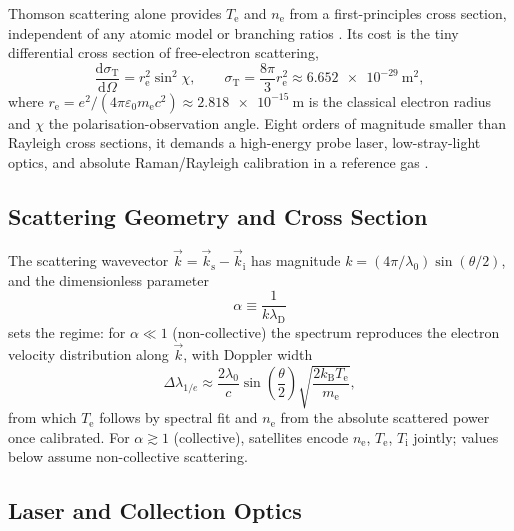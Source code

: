 Thomson scattering alone provides $T_{\mathrm{e}}$ and $n_{\mathrm{e}}$ from a first-principles cross section, independent of any atomic model or branching ratios \cite{ref0354,ref0384}. Its cost is the tiny differential cross section of free-electron scattering,
\begin{equation}
\frac{\mathrm{d}\sigma_{\mathrm{T}}}{\mathrm{d}\Omega} = r_{\mathrm{e}}^{2} \sin^{2}\chi , \qquad \sigma_{\mathrm{T}} = \frac{8\pi}{3} r_{\mathrm{e}}^{2} \approx \SI{6.652e-29}{\meter\squared} ,
\label{eq:specs-thomson-xsec}
\end{equation}
where $r_{\mathrm{e}} = e^{2}/(4\pi\varepsilon_{0} m_{\mathrm{e}} c^{2}) \approx \SI{2.818e-15}{\meter}$ is the classical electron radius and $\chi$ the polarisation-observation angle. Eight orders of magnitude smaller than Rayleigh cross sections, it demands a high-energy probe laser, low-stray-light optics, and absolute Raman/Rayleigh calibration in a reference gas \cite{ref0357,ref0362}.

\subsection{Scattering Geometry and Cross Section}

The scattering wavevector $\vec{k} = \vec{k}_{\mathrm{s}} - \vec{k}_{\mathrm{i}}$ has magnitude $k = (4\pi/\lambda_{0}) \sin(\theta/2)$, and the dimensionless parameter
\begin{equation}
\alpha \equiv \frac{1}{k \lambda_{\mathrm{D}}}
\label{eq:specs-alpha}
\end{equation}
sets the regime: for $\alpha \ll 1$ (non-collective) the spectrum reproduces the electron velocity distribution along $\vec{k}$, with Doppler width
\begin{equation}
\Delta\lambda_{1/e} \approx \frac{2\lambda_{0}}{c} \sin\!\left(\frac{\theta}{2}\right) \sqrt{\frac{2 k_{\mathrm{B}} T_{\mathrm{e}}}{m_{\mathrm{e}}}} ,
\label{eq:specs-thomson-doppler}
\end{equation}
from which $T_{\mathrm{e}}$ follows by spectral fit and $n_{\mathrm{e}}$ from the absolute scattered power once calibrated. For $\alpha \gtrsim 1$ (collective), satellites encode $n_{\mathrm{e}}$, $T_{\mathrm{e}}$, $T_{\mathrm{i}}$ jointly; values below assume non-collective scattering.

\subsection{Laser and Collection Optics}

